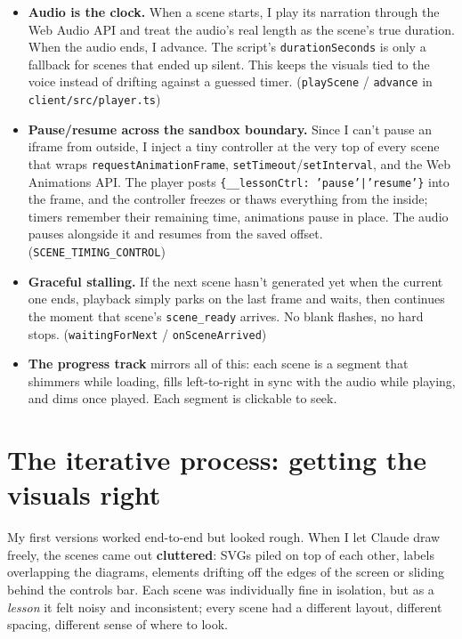 \documentclass[11pt]{article}
\newcommand{\code}[1]{\texttt{#1}}
\begin{document}
\begin{itemize}
  \item \textbf{Audio is the clock.} When a scene starts, I play its narration through the
  Web Audio API and treat the audio's real length as the scene's true duration.
  When the audio ends, I advance. The script's \code{durationSeconds} is only a
  fallback for scenes that ended up silent. This keeps the visuals tied to the
  voice instead of drifting against a guessed timer.
  (\code{playScene} / \code{advance} in \code{client/src/player.ts})

  \item \textbf{Pause/resume across the sandbox boundary.} Since I can't pause an iframe
  from outside, I inject a tiny controller at the very top of every scene that
  wraps \code{requestAnimationFrame}, \code{setTimeout}/\code{setInterval}, and the Web
  Animations API. The player posts \code{\{\_\_lessonCtrl: 'pause'|'resume'\}} into the
  frame, and the controller freezes or thaws everything from the inside; timers
  remember their remaining time, animations pause in place. The audio pauses
  alongside it and resumes from the saved offset. (\code{SCENE\_TIMING\_CONTROL})

  \item \textbf{Graceful stalling.} If the next scene hasn't generated yet when the
  current one ends, playback simply parks on the last frame and waits, then
  continues the moment that scene's \code{scene\_ready} arrives. No blank flashes, no
  hard stops. (\code{waitingForNext} / \code{onSceneArrived})

  \item \textbf{The progress track} mirrors all of this: each scene is a segment that
  shimmers while loading, fills left-to-right in sync with the audio while
  playing, and dims once played. Each segment is clickable to seek.
\end{itemize}

\hrulefill

\section*{The iterative process: getting the visuals right}

My first versions worked end-to-end but looked rough. When I let Claude draw
freely, the scenes came out \textbf{cluttered}: SVGs piled on top of each other,
labels overlapping the diagrams, elements drifting off the edges of the screen
or sliding behind the controls bar. Each scene was individually fine in
isolation, but as a \emph{lesson} it felt noisy and inconsistent; every scene had a
different layout, different spacing, different sense of where to look.
\end{document}
